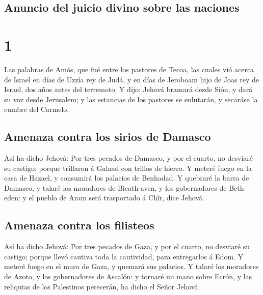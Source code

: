 \hypertarget{anuncio-del-juicio-divino-sobre-las-naciones}{%
\subsection{Anuncio del juicio divino sobre las
naciones}\label{anuncio-del-juicio-divino-sobre-las-naciones}}

\hypertarget{section}{%
\section{1}\label{section}}

 Las palabras de Amós, que fué entre los pastores de
Tecoa, las cuales vió acerca de Israel en días de Uzzía rey de Judá, y
en días de Jeroboam hijo de Joas rey de Israel, dos años antes del
terremoto.  Y dijo: Jehová bramará desde Sión, y dará su
voz desde Jerusalem; y las estancias de los pastores se enlutarán, y
secaráse la cumbre del Carmelo.

\hypertarget{amenaza-contra-los-sirios-de-damasco}{%
\subsection{Amenaza contra los sirios de
Damasco}\label{amenaza-contra-los-sirios-de-damasco}}

 Así ha dicho Jehová: Por tres pecados de Damasco, y por
el cuarto, no desviaré su castigo; porque trillaron á Galaad con trillos
de hierro.  Y meteré fuego en la casa de Hazael, y
consumirá los palacios de Benhadad.  Y quebraré la barra
de Damasco, y talaré los moradores de Bicath-aven, y los gobernadores de
Beth-eden: y el pueblo de Aram será trasportado á Chîr, dice Jehová.

\hypertarget{amenaza-contra-los-filisteos}{%
\subsection{Amenaza contra los
filisteos}\label{amenaza-contra-los-filisteos}}

 Así ha dicho Jehová: Por tres pecados de Gaza, y por el
cuarto, no desviaré su castigo; porque llevó cautiva toda la cautividad,
para entregarlos á Edom.  Y meteré fuego en el muro de
Gaza, y quemará sus palacios.  Y talaré los moradores de
Azoto, y los gobernadores de Ascalón: y tornaré mi mano sobre Ecrón, y
las reliquias de los Palestinos perecerán, ha dicho el Señor Jehová.

